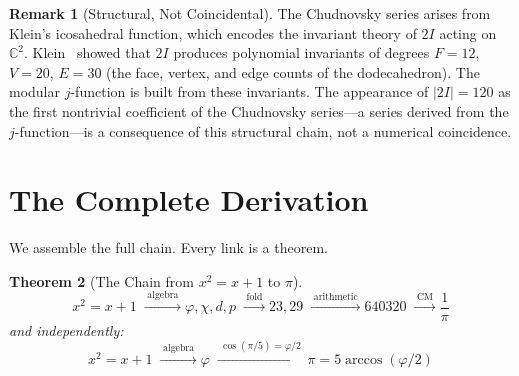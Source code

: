 \documentclass[11pt,a4paper]{article}
\theoremstyle{plain}
\newtheorem{theorem}{Theorem}[section]
\theoremstyle{definition}
\newtheorem{remark}[theorem]{Remark}
\begin{document}
\begin{remark}[Structural, Not Coincidental]\label{rem:structural}
The Chudnovsky series arises from Klein's icosahedral function, which
encodes the invariant theory of $2I$ acting on $\mathbb{C}^2$.
Klein~\cite{klein1884} showed that $2I$ produces polynomial invariants
of degrees $F = 12$, $V = 20$, $E = 30$ (the face, vertex, and edge
counts of the dodecahedron). The modular $j$-function is built from
these invariants. The appearance of $|2I| = 120$ as the first
nontrivial coefficient of the Chudnovsky series---a series derived from
the $j$-function---is a consequence of this structural chain, not a
numerical coincidence.
\end{remark}

\section{The Complete Derivation}\label{sec:complete}

We assemble the full chain. Every link is a theorem.

\begin{theorem}[The Chain from $x^2 = x + 1$ to $\pi$]
\label{thm:chain}
\begin{equation}\label{eq:chain}
  \boxed{\;
  x^2 = x + 1
  \;\xrightarrow{\;\text{algebra}\;}
  \varphi, \chi, d, p
  \;\xrightarrow{\;\text{fold}\;}
  23, 29
  \;\xrightarrow{\;\text{arithmetic}\;}
  640320
  \;\xrightarrow{\;\text{CM}\;}
  \frac{1}{\pi}
  \;}
\end{equation}
and independently:
\begin{equation}\label{eq:direct}
  \boxed{\;
  x^2 = x + 1
  \;\xrightarrow{\;\text{algebra}\;}
  \varphi
  \;\xrightarrow{\;\cos(\pi/5) = \varphi/2\;}
  \pi = 5\arccos(\varphi/2)
  \;}
\end{equation}
\end{theorem}
\end{document}
